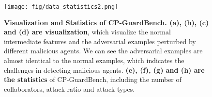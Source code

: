\begin{figure}[t]
    \centering
    \texttt{[image: fig/data\_statistics2.png]}
    \vspace{-8mm}
    \caption{\textbf{Visualization and Statistics of CP-GuardBench. (a), (b), (c)  and (d) are visualization}, which visualize the normal intermediate features and the adversarial examples perturbed by different malicious agents. We can see the adversarial examples are almost identical to the normal examples, which indicates the challenges in detecting malicious agents. \textbf{(e), (f), (g) and (h) are the statistics} of CP-GuardBench, including the number of collaborators, attack ratio and attack types.} 
    \label{fig:data_statistics}
    \vspace{-8mm} 
\end{figure}